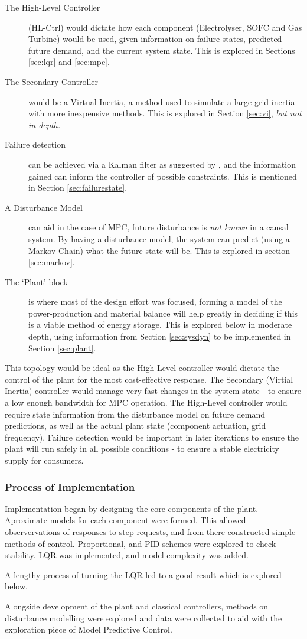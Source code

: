 \begin{description}
        \item[The High-Level Controller] (HL-Ctrl) would dictate how each component (Electrolyser, SOFC and Gas Turbine) would be used, given information on failure states, predicted future demand, and the current system state. This is explored in Sections \ref{sec:lqr} and \ref{sec:mpc}.
        \item[The Secondary Controller] would be a Virtual Inertia, a method used to simulate a large grid inertia with more inexpensive methods. {This is explored in Section \ref{sec:vi}, \emph{but not in depth.}}
        \item[Failure detection] can be achieved via a Kalman filter as suggested by \cite{power:kalman}, and the information gained can inform the controller of possible constraints. {This is mentioned in Section \ref{sec:failurestate}.}
        \item[A Disturbance Model] can aid in the case of MPC, future disturbance is \emph{not known} in a causal system. By having a disturbance model, the system can predict (using a Markov Chain) what the future state will be. {This is explored in section \ref{sec:markov}.}
        \item[The `Plant' block] is where most of the design effort was focused, forming a model of the power-production and material balance will help greatly in deciding if this is a viable method of energy storage. {This is explored below in moderate depth, using information from Section \ref{sec:sysdyn} to be implemented in Section \ref{sec:plant}.}
\end{description}

This topology would be ideal as the High-Level controller would dictate the control of the plant for the most cost-effective response.
The Secondary (Virtial Inertia) controller would manage very fast changes in the system state - to ensure a low enough bandwidth for MPC operation.
The High-Level controller would require state information from the disturbance model on future demand predictions, as well as the actual plant state (component actuation, grid frequency).
Failure detection would be important in later iterations to ensure the plant will run safely in all possible conditions - to ensure a stable electricity supply for consumers.

\subsubsection{Process of Implementation}

Implementation began by designing the core components of the plant.
Aproximate models for each component were formed.
This allowed observervations of responses to step requests, and from there constructed simple methods of control.
Proportional, and PID schemes were explored to check stability.
LQR was implemented, and model complexity was added.

A lengthy process of turning the LQR led to a good result which is explored below.

Alongside development of the plant and classical controllers, methods on disturbance modelling were explored and data were collected to aid with the exploration piece of Model Predictive Control.
